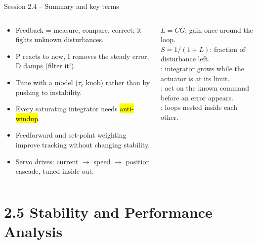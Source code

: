 \documentclass[aspectratio=169,10pt]{beamer}
\begin{document}
\begin{frame}{Session 2.4 -- Summary and key terms}
\begin{columns}[T]
\begin{keybox}
\footnotesize
\begin{itemize}
  \item Feedback = measure, compare, correct; it fights unknown disturbances.
  \item P reacts to now, I removes the steady error, D damps (filter it!).
  \item Tune with a model ($\tau_c$ knob) rather than by pushing to instability.
  \item Every saturating integrator needs \hl{anti-windup}.
  \item Feedforward and set-point weighting improve tracking without changing stability.
  \item Servo drives: current $\to$ speed $\to$ position cascade, tuned inside-out.
\end{itemize}
\end{keybox}
\begin{defbox}
\footnotesize
{} $L=CG$: gain once around the loop.\\
 $S=1/(1+L)$: fraction of disturbance left.\\
: integrator grows while the actuator is at its limit.\\
: act on the known command before an error appears.\\
: loops nested inside each other.
\end{defbox}
\end{columns}
\end{frame}

\section{2.5 Stability and Performance Analysis}
\end{document}
